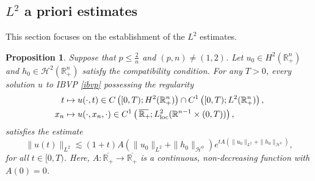 \documentclass[preprint,compress,12pt]{elsarticle}
\newtheorem{proposition}[theorem]{Proposition}
\numberwithin{equation}{section}
\begin{document}
\subsection{$L^{2}$ a priori estimates}
This section focuses on the establishment of the  $L^{2}$ estimates.
\begin{proposition}\label{vindictive}
	Suppose that $p\leq \frac{2}{n}$ and $(p,n)\neq (1,2)$. Let $u_{0}\in H^{2}(\mathbb{R}^{n}_{+})$ and $h_{0}\in\mathcal{H}^{2}(\mathbb{R}^{n}_{+})$ satisfy the compatibility condition. For any $T>0$, every solution $u$ to IBVP \eqref{ibvp} possessing the regularity
	\begin{align}
		t&\mapsto u(\cdot,t) \in C\left([0,T);H^{2}(\mathbb{R}^{n}_{+})\right)\cap C^{1}\left([0,T);L^{2}(\mathbb{R}^{n}_{+})\right),\label{assuage} \\
		x_{n}&\mapsto u(\cdot,x_{n},\cdot) \in  C^{1}\left(\,\overline{\mathbb{R}_{+}\mkern-4mu}\,;L^{2}_{\mathrm{loc}}(\mathbb{R}^{n-1}\times(0,T))\right)\label{enigmatic},
	\end{align}
	satisfies the  estimate
	\begin{equation}
		\|u(t)\|_{L^{2}}\lesssim  (1+t) A\left(\|u_{0}\|_{L^{2}}+\|h_{0}\|_{\mathcal{H}^{0}}\right) e^{tA\left(\|u_{0}\|_{L^{2}}+\|h_{0}\|_{\mathcal{H}^{0}}\right)},
	\end{equation}
	for all $t\in[0,T)$. Here, $A:\overline{\mathbb{R}_{+}}\rightarrow \overline{\mathbb{R}_{+}}$ is a continuous,  non-decreasing function with $A(0)=0$.	
\end{proposition}
\end{document}
